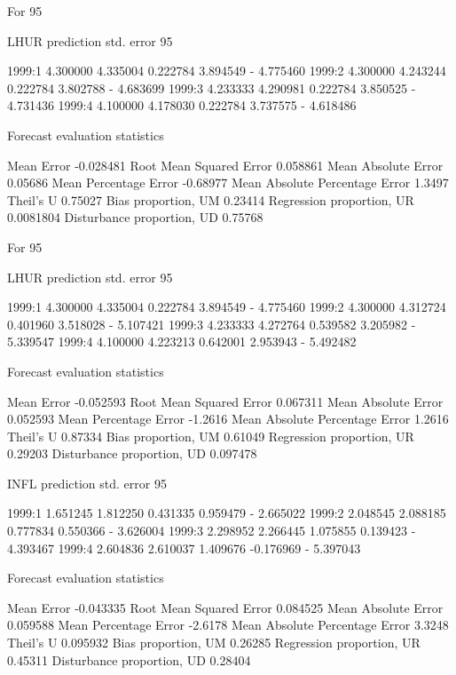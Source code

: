 \begin{code}
 For 95%

               LHUR    prediction    std. error        95%

1999:1     4.300000     4.335004     0.222784     3.894549 - 4.775460
1999:2     4.300000     4.243244     0.222784     3.802788 - 4.683699
1999:3     4.233333     4.290981     0.222784     3.850525 - 4.731436
1999:4     4.100000     4.178030     0.222784     3.737575 - 4.618486

  Forecast evaluation statistics

  Mean Error                       -0.028481
  Root Mean Squared Error           0.058861
  Mean Absolute Error               0.05686
  Mean Percentage Error            -0.68977
  Mean Absolute Percentage Error    1.3497
  Theil's U                         0.75027
  Bias proportion, UM               0.23414
  Regression proportion, UR         0.0081804
  Disturbance proportion, UD        0.75768


 For 95%

               LHUR    prediction    std. error        95%

1999:1     4.300000     4.335004     0.222784     3.894549 - 4.775460
1999:2     4.300000     4.312724     0.401960     3.518028 - 5.107421
1999:3     4.233333     4.272764     0.539582     3.205982 - 5.339547
1999:4     4.100000     4.223213     0.642001     2.953943 - 5.492482

  Forecast evaluation statistics

  Mean Error                       -0.052593
  Root Mean Squared Error           0.067311
  Mean Absolute Error               0.052593
  Mean Percentage Error            -1.2616
  Mean Absolute Percentage Error    1.2616
  Theil's U                         0.87334
  Bias proportion, UM               0.61049
  Regression proportion, UR         0.29203
  Disturbance proportion, UD        0.097478

               INFL    prediction    std. error        95%

1999:1     1.651245     1.812250     0.431335     0.959479 - 2.665022
1999:2     2.048545     2.088185     0.777834     0.550366 - 3.626004
1999:3     2.298952     2.266445     1.075855     0.139423 - 4.393467
1999:4     2.604836     2.610037     1.409676    -0.176969 - 5.397043

  Forecast evaluation statistics

  Mean Error                       -0.043335
  Root Mean Squared Error           0.084525
  Mean Absolute Error               0.059588
  Mean Percentage Error            -2.6178
  Mean Absolute Percentage Error    3.3248
  Theil's U                         0.095932
  Bias proportion, UM               0.26285
  Regression proportion, UR         0.45311
  Disturbance proportion, UD        0.28404
\end{code}

